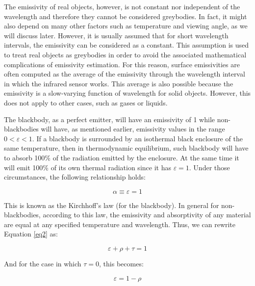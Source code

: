 		\bigskip
		The emissivity of real objects, however, is not constant nor independent of the wavelength and therefore they cannot be considered greybodies. In fact, it might also depend on many other factors such as temperature and viewing angle, as we will discuss later. However, it is usually assumed that for short wavelength intervals, the emissivity can be considered as a constant. This assumption is used to treat real objects as greybodies in order to avoid the associated mathematical complications of emissivity estimation. For this reason, surface emissivities are often computed as the average of the emissivity through the wavelength interval in which the infrared sensor works. This average is also possible because the emissivity is a slow-varying function of wavelength for solid objects. However, this does not apply to other cases, such as gases or liquids.
		
		The blackbody, as a perfect emitter, will have an emissivity of 1 while non-blackbodies will have, as mentioned earlier, emissivity values in the range $0<\varepsilon<1$. If a blackbody is surrounded by an isothermal black enclosure of the same temperature, then in thermodynamic equilibrium, such blackbody will have to absorb 100\% of the radiation emitted by the enclosure. At the same time it will emit 100\% of its own thermal radiation since it has $\varepsilon=1$. Under those circumstances, the following relationship holds:
		
		\begin{equation}
			\label{eq5}
			\alpha \equiv \varepsilon=1
		\end{equation}	
		
		This is known as the Kirchhoff's law (for the blackbody). In general for non-blackbodies, according to this law, the emissivity and absorptivity of any material are equal at any specified temperature and wavelength. Thus, we can rewrite Equation \ref{eq2} as:	
		
		\begin{equation}
			\label{eq6}
			\varepsilon + \rho + \tau = 1
		\end{equation}	
		
		And for the case in which $\tau=0$, this becomes:
		
		\begin{equation}
			\label{eq7}
			\varepsilon = 1 - \rho
		\end{equation}	
		
		
			